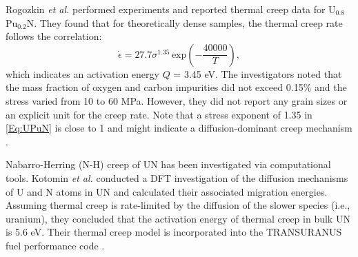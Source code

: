 \documentclass[preprint,12pt,sort&compress]{elsarticle} %
\newcommand{\?}{\stackrel{?}{=}}
\begin{document}
Rogozkin \textit{et al.} \cite{Rogozkin2003} performed experiments and reported thermal creep data for U$_{0.8}$Pu$_{0.2}$N. They found that for theoretically dense samples, the thermal creep rate follows the correlation:
\begin{equation}
\Dot{\epsilon} = 27.7 \sigma^{1.35} \, \mathrm{exp} \! \left( - \frac{40000}{T} \right),
\label{Eq:UPuN}
\end{equation}
which indicates an activation energy $Q$ = 3.45 eV. The investigators noted that the mass fraction of oxygen and carbon impurities did not exceed 0.15\% and the stress varied from 10 to 60 MPa. However, they did not report any grain sizes or an explicit unit for the creep rate. Note that a stress exponent of 1.35 in \cref{Eq:UPuN} is close to 1 and might indicate a diffusion-dominant creep mechanism \cite{Rogozkin2003, Meyers2009}.

Nabarro-Herring (N-H) creep of UN has been investigated via computational tools. Kotomin \textit{et al.} \cite{Kotomin2009} conducted a DFT investigation of the diffusion mechanisms of U and N atoms in UN and calculated their associated migration energies. Assuming thermal creep is rate-limited by the diffusion of the slower species (i.e., uranium), they concluded that the activation energy of thermal creep in bulk UN is 5.6 eV. Their thermal creep model is incorporated into the TRANSURANUS fuel performance code \cite{Kotomin2009}.
\end{document}
